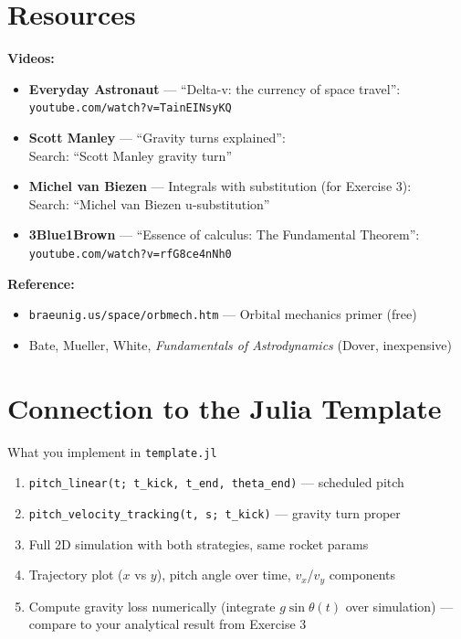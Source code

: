 \documentclass[12pt, a4paper]{article}
\begin{document}
\begin{solutionspace}[9cm]
\end{solutionspace}

\section{Resources}

\begin{hintbox}
\textbf{Videos:}
\begin{itemize}
  \item \textbf{Everyday Astronaut} — ``Delta-v: the currency of space travel'':\\
        \texttt{youtube.com/watch?v=TainEINsyKQ}
  \item \textbf{Scott Manley} — ``Gravity turns explained'':\\
        Search: ``Scott Manley gravity turn''
  \item \textbf{Michel van Biezen} — Integrals with substitution (for Exercise 3):\\
        Search: ``Michel van Biezen u-substitution''
  \item \textbf{3Blue1Brown} — ``Essence of calculus: The Fundamental Theorem'':\\
        \texttt{youtube.com/watch?v=rfG8ce4nNh0}
\end{itemize}
\textbf{Reference:}
\begin{itemize}
  \item \texttt{braeunig.us/space/orbmech.htm} — Orbital mechanics primer (free)
  \item Bate, Mueller, White, \textit{Fundamentals of Astrodynamics} (Dover, inexpensive)
\end{itemize}
\end{hintbox}

\section{Connection to the Julia Template}

\begin{theorybox}{What you implement in \texttt{template.jl}}
\begin{enumerate}
  \item \texttt{pitch\_linear(t; t\_kick, t\_end, theta\_end)} — scheduled pitch
  \item \texttt{pitch\_velocity\_tracking(t, s; t\_kick)} — gravity turn proper
  \item Full 2D simulation with both strategies, same rocket params
  \item Trajectory plot ($x$ vs $y$), pitch angle over time, $v_x$/$v_y$ components
  \item Compute gravity loss numerically (integrate $g\sin\theta(t)$ over simulation) — compare to your analytical result from Exercise 3
\end{enumerate}
\end{theorybox}
\end{document}
